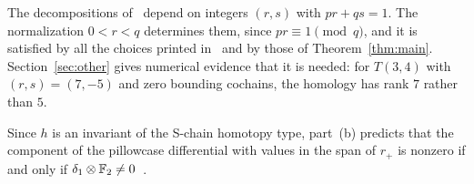 The decompositions of~\cite[\S\S10--11]{HHK2} depend on integers $(r,s)$ with $pr+qs=1$. The normalization
$0<r<q$ determines them, since $pr\equiv1\pmod q$, and it is satisfied by all the choices printed
in~\cite[\S11]{HHK2} and by those of Theorem~\ref{thm:main}. Section~\ref{sec:other} gives numerical evidence that it is
needed: for $T(3,4)$ with $(r,s)=(7,-5)$ and zero bounding cochains, the homology has rank $7$ rather than $5$.

Since $h$ is an invariant of the S-chain homotopy type, part~(b) predicts that the component of the pillowcase
differential with values in the span of $r_+$ is nonzero if and only if $\delta_1\otimes\mathbb{F}_2\neq0$~\cite{W26}.
